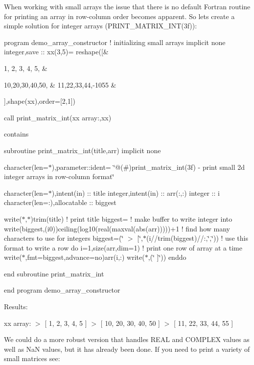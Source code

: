When working with small arrays the issue that there is no default Fortran routine for printing an array in row-\/column order becomes apparent. So lets create a simple solution for integer arrays (P\+R\+I\+N\+T\+\_\+\+M\+A\+T\+R\+I\+X\+\_\+\+I\+N\+T(3f))\+:

program demo\+\_\+array\+\_\+constructor ! initializing small arrays implicit none integer,save \+:\+: xx(3,5)= reshape(\mbox{[}\& \begin{DoxyVerb}1, 2, 3, 4, 5, &
\end{DoxyVerb}
 10,20,30,40,50, \& 11,22,33,44,-\/1055 \&

\mbox{]},shape(xx),order=\mbox{[}2,1\mbox{]})

call print\+\_\+matrix\+\_\+int(\textquotesingle{}xx array\+:\textquotesingle{},xx)

contains

subroutine print\+\_\+matrix\+\_\+int(title,arr) implicit none

character(len=$\ast$),parameter\+::ident= \char`\"{}@(\#)print\+\_\+matrix\+\_\+int(3f) -\/ print small 2d integer arrays in row-\/column format\char`\"{}

character(len=$\ast$),intent(in) \+:\+: title integer,intent(in) \+:\+: arr(\+:,\+:) integer \+:\+: i character(len=\+:),allocatable \+:\+: biggest

write($\ast$,$\ast$)trim(title) ! print title biggest=\textquotesingle{} \textquotesingle{} ! make buffer to write integer into write(biggest,\textquotesingle{}(i0)\textquotesingle{})ceiling(log10(real(maxval(abs(arr)))))+1 ! find how many characters to use for integers biggest=\textquotesingle{}(\char`\"{} $>$ \mbox{[}\char`\"{},$\ast$(i\textquotesingle{}//trim(biggest)//\textquotesingle{}\+:,\char`\"{},\char`\"{}))\textquotesingle{} ! use this format to write a row do i=1,size(arr,dim=1) ! print one row of array at a time write($\ast$,fmt=biggest,advance=\textquotesingle{}no\textquotesingle{})arr(i,\+:) write($\ast$,\textquotesingle{}(\char`\"{} \mbox{]}\char`\"{})\textquotesingle{}) enddo

end subroutine print\+\_\+matrix\+\_\+int

end program demo\+\_\+array\+\_\+constructor

Results\+:

xx array\+: $>$ \mbox{[} 1, 2, 3, 4, 5 \mbox{]} $>$ \mbox{[} 10, 20, 30, 40, 50 \mbox{]} $>$ \mbox{[} 11, 22, 33, 44, 55 \mbox{]}

We could do a more robust version that handles R\+E\+AL and C\+O\+M\+P\+L\+EX values as well as NaN values, but it has already been done. If you need to print a variety of small matrices see\+:


